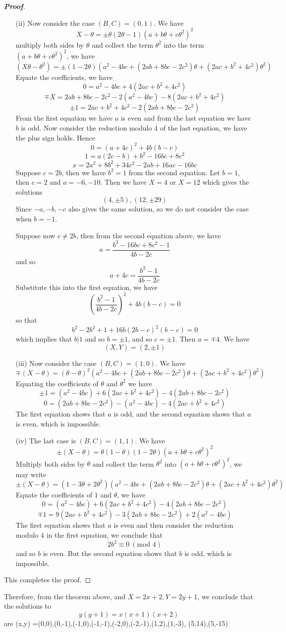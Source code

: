 \begin{proof}[\bf Proof]
\begin{enumerate}
\item[(ii)] Now consider the case $(B,C)=(0,1)$. We have
$$X-\theta=\pm \theta(2\theta-1)(a+b\theta+c\theta^2)^2$$
multiply both sides by $\theta$ and collect the term $\theta^2$ into the term $(a+b\theta+c\theta^2)^2$, we
have
$$(X\theta-\theta^2)=\pm (1-2\theta)(a^2-4bc+(2ab+8bc-2c^2)\theta+(2ac+b^2+4c^2)\theta^2)$$
Equate the coefficients, we have
$$0=a^2-4bc+4(2ac+b^2+4c^2)$$
$$\mp X=2ab+8bc-2c^2-2(a^2-4bc)-8(2ac+b^2+4c^2)$$
$$\pm 1=2ac+b^2+4c^2-2(2ab+8bc-2c^2)$$
From the first equation we have $a$ is even and from the last equation we have $b$ is odd. Now consider
the reduction modulo $4$ of the last equation, we have the plus sign holds.
Hence
$$0=(a+4c)^2+4b(b-c)$$
$$1=a(2c-b)+b^2-16bc+8c^2$$
$$x=2a^2+8b^2+34c^2-2ab+16ac-16bc$$
Suppose $c=2b$, then we have $b^2=1$ from the second equation. Let $b=1$, then $c=2$ and $a=-6,-10$.
Then we have $X=4$ or $X=12$ which gives the solutions
$$(4,\pm 5),(12,\pm 29)$$
Since $-a,-b,-c$ also gives the same solution, so we do not consider the case when $b=-1$.

Suppose now $c \neq 2b$, then from the second equation above, we have
$$a=\frac{b^2-16bc+8c^2-1}{4b-2c}$$
and so
$$a+4c=\frac{b^2-1}{4b-2c}$$
Substitute this into the first equation, we have
$$\left(\frac{b^2-1}{4b-2c}\right)^2+4b(b-c)=0$$
so that
$$b^2-2b^2+1+16b(2b-c)^2(b-c)=0$$
which implies that $b|1$ and so $b=\pm 1$, and so $c=\pm 1$. Then $a=\mp 4$. We have
$$(X,Y)=(2,\pm 1)$$
\item[(iii)] Now consider the case $(B,C)=(1,0)$. We have
$$\mp(X-\theta)=(\theta-\theta)^2(a^2-4bc+(2ab+8bc-2c^2)\theta+(2ac+b^2+4c^2)\theta^2)$$
Equating the coefficients of $\theta$ and $\theta^2$ we have
$$\pm 1=(a^2-4bc)+6(2ac+b^2+4c^2)-4(2ab+8bc-2c^2)$$
$$0=(2ab+8bc-2c^2)-(a^2-4bc)-4(2ac+b^2+4c^2)$$
The first equation shows that $a$ is odd, and the second equation shows that $a$ is even, which is impossible.\\
\item[(iv)] The last case is $(B,C)=(1,1)$. We have
$$\pm(X-\theta)=\theta(1-\theta)(1-2\theta)(a+b\theta+c\theta^2)^2$$
Multiply both sides by $\theta$ and collect the term $\theta^2$ into $(a+b\theta+c\theta^2)^2$, we may write
$$\pm(X-\theta)=(1-3\theta+2\theta^2)(a^2-4bc+(2ab+8bc-2c^2)\theta+(2ac+b^2+4c^2)\theta^2)$$
Equate the coefficients of $1$ and $\theta$, we have
$$0=(a^2-4bc)+6(2ac+b^2+4c^2)-4(2ab+8bc-2c^2)$$
$$\mp1=9(2ac+b^2+4c^2)-3(2ab+8bc-2c^2)+2(a^2-4bc)$$
The first equation shows that $a$ is even and then consider the reduction modulo $4$ in the first equation,
we conclude that
$$2b^2 \equiv 0~(\text{mod } 4)$$
and so $b$ is even. But the second equation shows that $b$ is odd, which is impossible.
\end{enumerate}
This completes the proof.
\end{proof}
Therefore, from the theorem above, and $X=2x+2,Y=2y+1$, we conclude that the solutions to
$$y(y+1)=x(x+1)(x+2)$$ are
\be
(x,y) =(0,0),(0,-1),(-1,0),(-1,-1),(-2,0),(-2,-1),(1,2),(1,-3), (5,14),(5,-15)
\ee

